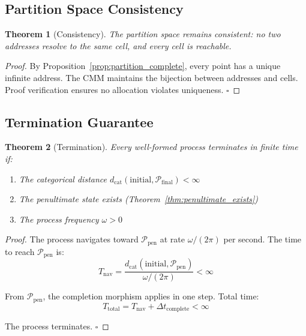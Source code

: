 \documentclass[twocolumn,10pt]{article}
\newtheorem{theorem}{Theorem}[section]
\theoremstyle{definition}
\theoremstyle{remark}
\newcommand{\pentstate}{\mathcal{P}_{\text{pen}}}
\newcommand{\finalstate}{\mathcal{P}_{\text{final}}}
\newcommand{\dcat}{d_{\text{cat}}}
\begin{document}
\subsection{Partition Space Consistency}

\begin{theorem}[Consistency]
The partition space remains consistent: no two addresses resolve to the same cell, and every cell is reachable.
\end{theorem}

\begin{proof}
By Proposition~\ref{prop:partition_complete}, every point has a unique infinite address. The CMM maintains the bijection between addresses and cells. Proof verification ensures no allocation violates uniqueness. $\square$
\end{proof}

\subsection{Termination Guarantee}

\begin{theorem}[Termination]
Every well-formed process terminates in finite time if:
\begin{enumerate}
    \item The categorical distance $\dcat(\text{initial}, \finalstate) < \infty$
    \item The penultimate state exists (Theorem~\ref{thm:penultimate_exists})
    \item The process frequency $\omega > 0$
\end{enumerate}
\end{theorem}

\begin{proof}
The process navigates toward $\pentstate$ at rate $\omega/(2\pi)$ per second. The time to reach $\pentstate$ is:
\begin{equation}
    T_{\text{nav}} = \frac{\dcat(\text{initial}, \pentstate)}{\omega/(2\pi)} < \infty
\end{equation}

From $\pentstate$, the completion morphism applies in one step. Total time:
\begin{equation}
    T_{\text{total}} = T_{\text{nav}} + \Delta t_{\text{complete}} < \infty
\end{equation}

The process terminates. $\square$
\end{proof}
\end{document}
